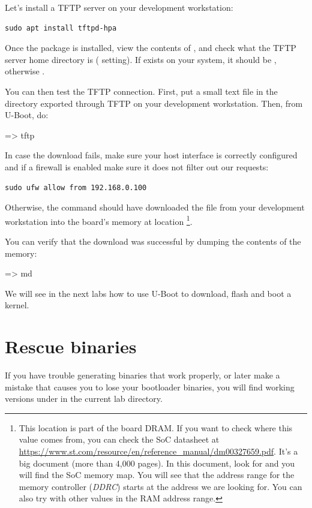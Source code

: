 Let's install a TFTP server on your development workstation:

\begin{verbatim}
sudo apt install tftpd-hpa
\end{verbatim}

Once the package is installed, view the contents of
, and check what the TFTP server home directory is
( setting). If  exists on your system,
it should be , otherwise .

You can then test the TFTP connection. First, put a small text file in
the directory exported through TFTP on your development
workstation. Then, from U-Boot, do:

\begin{ubootinput}
=> tftp %
\end{ubootinput}

In case the download fails, make sure your host interface is correctly
configured and if a firewall is enabled make sure it does not filter out our
requests:
\begin{verbatim}
sudo ufw allow from 192.168.0.100
\end{verbatim}

Otherwise, the  command should have downloaded the
 file from your development workstation into
the board's memory at location {\tt \zimageboardaddr}\footnote{
This location is part of the board DRAM. If you want
to check where this value comes from, you can check the SoC
datasheet at
\url{https://www.st.com/resource/en/reference_manual/dm00327659.pdf}.
It's a big document (more than 4,000 pages). In this document, look
for  and you will find the SoC memory map.
You will see that the address range for the memory controller
({\em DDRC})
starts at the address we are looking for.
You can also try with other values in the RAM address range.}.

You can verify that the download was successful by dumping the
contents of the memory:

\begin{ubootinput}
=> md %
\end{ubootinput}

We will see in the next labs how to use U-Boot to download, flash and
boot a kernel.

\section{Rescue binaries}

If you have trouble generating binaries that work properly, or later
make a mistake that causes you to lose your bootloader binaries, you
will find working versions under  in the current lab
directory.
